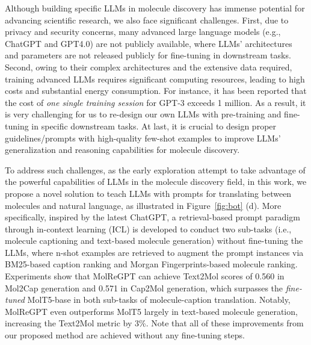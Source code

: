 \documentclass{article}
\theoremstyle{plain}
\theoremstyle{definition}
\theoremstyle{remark}
\begin{document}
Although building specific LLMs in molecule discovery has immense potential for advancing scientific research, we also face significant challenges. First, due to privacy and security concerns, many advanced large language models (e.g., ChatGPT and GPT4.0) are not publicly available, where LLMs' architectures and parameters are not released publicly for fine-tuning in downstream tasks.
Second, owing to their complex architectures and the extensive data required, training advanced LLMs requires significant computing resources, leading to high costs and substantial energy consumption. 
For instance, it has been reported that the cost of \emph{one single training session} for GPT-3 exceeds 1 million.
As a result, it is very challenging for us to re-design our own LLMs with pre-training and fine-tuning in specific downstream tasks. 
At last, it is crucial to design proper guidelines/prompts with high-quality few-shot examples to improve LLMs' generalization and reasoning capabilities for molecule discovery.  


To address such challenges, as the early exploration attempt to take advantage of the powerful capabilities of LLMs in the molecule discovery field, in this work, we propose a novel solution to teach LLMs with prompts for translating between molecules and natural language, as illustrated in Figure~\ref{fig:bot} (d).
More specifically, inspired by the latest ChatGPT, a retrieval-based prompt paradigm through in-context learning (ICL) is developed to conduct two sub-tasks (i.e., molecule captioning and text-based molecule generation) without fine-tuning the LLMs, where n-shot examples are retrieved to augment the prompt instances via BM25-based caption ranking and Morgan Fingerprints-based molecule ranking. 
Experiments show that MolReGPT can achieve Text2Mol scores of 0.560 in Mol2Cap generation and 0.571 in Cap2Mol generation, which surpasses the \emph{fine-tuned} MolT5-base in both sub-tasks of molecule-caption translation. 
Notably, MolReGPT even outperforms MolT5 largely in text-based molecule generation, increasing the Text2Mol metric by 3\%. Note that all of these improvements from our proposed method are achieved without any fine-tuning steps. 
\end{document}

